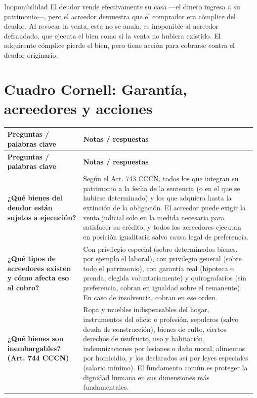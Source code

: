 \documentclass[12pt,oneside]{book}
\newcommand{\cornellinicio}{\begingroup\small\renewcommand{\arraystretch}{1.4}}
\newcommand{\cornellpregunta}[2]{\textbf{#1} & #2 \\ \hline}
\begin{document}
\begin{example}{Inoponibilidad}
El deudor vende efectivamente su casa ---el dinero ingresa a su patrimonio---, pero el acreedor demuestra que el comprador era cómplice del deudor. Al revocar la venta, esta no se anula: es inoponible al acreedor defraudado, que ejecuta el bien como si la venta no hubiera existido. El adquirente cómplice pierde el bien, pero tiene acción para cobrarse contra el deudor originario.
\end{example}

\section{Cuadro Cornell: Garantía, acreedores y acciones}

\cornellinicio
\begin{longtable}{|Q|Z|}
\hline
{}\textbf{Preguntas / palabras clave} & \textbf{Notas / respuestas} \\ \hline
\endfirsthead
\hline
{}\textbf{Preguntas / palabras clave} & \textbf{Notas / respuestas} \\ \hline
\endhead

\cornellpregunta{¿Qué bienes del deudor están sujetos a ejecución?}{%
Según el Art. 743 CCCN, todos los que integran su patrimonio a la fecha de la sentencia (o en el que se hubiese determinado) y los que adquiera hasta la extinción de la obligación. El acreedor puede exigir la venta judicial solo en la medida necesaria para satisfacer su crédito, y todos los acreedores ejecutan en posición igualitaria salvo causa legal de preferencia.}

\cornellpregunta{¿Qué tipos de acreedores existen y cómo afecta eso al cobro?}{%
Con privilegio especial (sobre determinados bienes, por ejemplo el laboral), con privilegio general (sobre todo el patrimonio), con garantía real (hipoteca o prenda, elegida voluntariamente) y quirografarios (sin preferencia, cobran en igualdad sobre el remanente). En caso de insolvencia, cobran en ese orden.
}

\cornellpregunta{¿Qué bienes son inembargables? (Art. 744 CCCN)}{%
Ropa y muebles indispensables del hogar, instrumentos del oficio o profesión, sepulcros (salvo deuda de construcción), bienes de culto, ciertos derechos de usufructo, uso y habitación, indemnizaciones por lesiones o daño moral, alimentos por homicidio, y los declarados así por leyes especiales (salario mínimo). El fundamento común es proteger la dignidad humana en sus dimensiones más fundamentales.}


\end{longtable}
\end{document}
